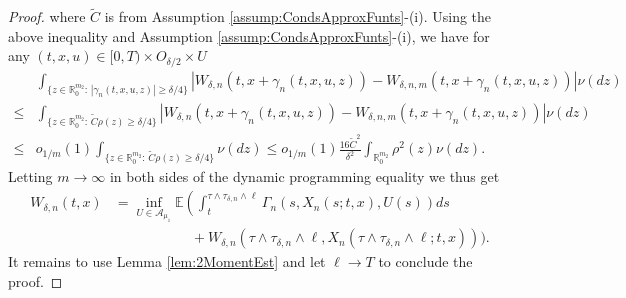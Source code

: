 \documentclass[amscd,amssymb,11pt]{article}
\numberwithin{theorem}{section}
\numberwithin{equation}{section}
\begin{document}
\begin{proof}
where $\widetilde{C}$ is from Assumption \ref{assump:CondsApproxFunts}-(i).
Using the above inequality and Assumption \ref{assump:CondsApproxFunts}-(i), we have for any $(t,x,u)\in [0,T)\times O_{\delta/2}\times U$
\begin{align*}
&\int_{\{z\in \mathbb R_0^{m_2}:\,|\gamma_n(t,x,u,z)|\geq \delta/4\}}\left|W_{\delta,n}\left(t,x+\gamma_{n}(t,x,u,z)\right)-W_{\delta,n,m}\left(t,x+\gamma_{n}(t,x,u,z)\right)\right|\nu(dz)\\
\leq&\int_{\{z\in \mathbb R_0^{m_2}:\,\widetilde{C}\rho(z)\geq \delta/4\}}\left|W_{\delta,n}\left(t,x+\gamma_{n}(t,x,u,z)\right)-W_{\delta,n,m}\left(t,x+\gamma_{n}(t,x,u,z)\right)\right|\nu(dz)\\
\leq& o_{1/m}(1)\int_{\{z\in \mathbb R_0^{m_2}:\,\widetilde{C}\rho(z)\geq \delta/4\}}\nu(dz)\leq o_{1/m}(1)\frac{16{\widetilde{C}}^2}{\delta^2}\int_{\mathbb R_0^{m_2}}\rho^2(z)\nu(dz).
\end{align*}
Letting $m\rightarrow\infty$ in both sides of the dynamic programming equality we thus get
\begin{align*}%
W_{\delta,n}(t,x)&=\inf_{U\in\mathcal{A}_{\mu_{1}}}\mathbb{E}\left(\int_{t}^{\tau\wedge\tau_{\delta,n}
\wedge\ell}\Gamma_{n}\left(s,X_{n}(s;t,x),U(s)\right)ds\right.\nonumber\\
&\qquad\qquad\quad\,\,\,+W_{\delta,n}\left(\tau\wedge\tau_{\delta,n}\wedge\ell,X_{n}(\tau\wedge\tau_{\delta,n}
\wedge\ell;t,x)\right)\bigg).
\end{align*}
It remains to use Lemma \ref{lem:2MomentEst} and let $\ell\to T$ to conclude the proof.
\end{proof}




\end{document}
